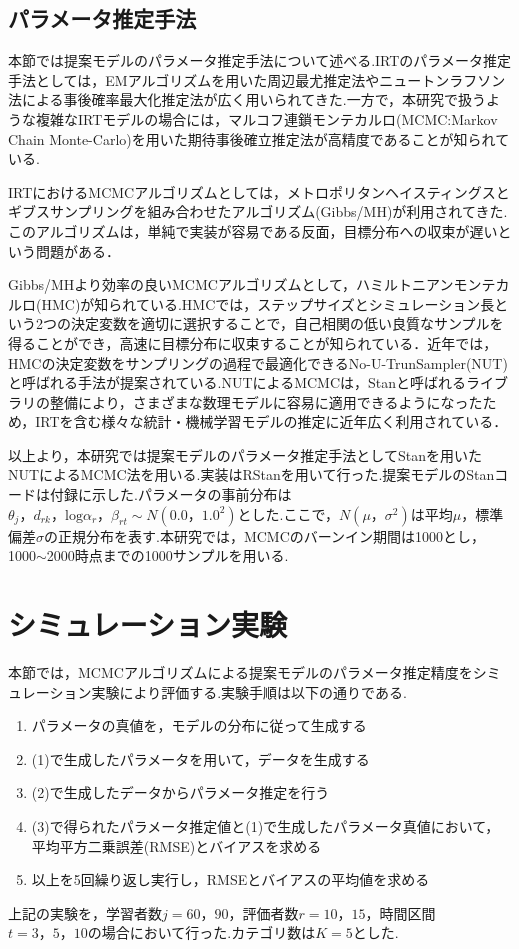\documentclass[a4paper,11pt,oneside,openany]{jsbook}
\begin{document}
\section{パラメータ推定手法}
本節では提案モデルのパラメータ推定手法について述べる.IRTのパラメータ推定手法としては，EMアルゴリズムを用いた周辺最尤推定法やニュートンラフソン法による事後確率最大化推定法が広く用いられてきた.一方で，本研究で扱うような複雑なIRTモデルの場合には，マルコフ連鎖モンテカルロ(MCMC:Markov Chain Monte-Carlo)を用いた期待事後確立推定法が高精度であることが知られている\cite{IRTUtoUeno,norm}.

IRTにおけるMCMCアルゴリズムとしては，メトロポリタンヘイスティングスとギブスサンプリングを組み合わせたアルゴリズム(Gibbs/MH)\cite{IRTUtoUeno,Patz,BiasUsami}が利用されてきた.このアルゴリズムは，単純で実装が容易である反面，目標分布への収束が遅いという問題がある\cite{Hoffman,Giroami}．

Gibbs/MHより効率の良いMCMCアルゴリズムとして，ハミルトニアンモンテカルロ(HMC)が知られている\cite{Rosenthal}.HMCでは，ステップサイズとシミュレーション長という2つの決定変数を適切に選択することで，自己相関の低い良質なサンプルを得ることができ，高速に目標分布に収束することが知られている\cite{Hoffman,Neal}．近年では，HMCの決定変数をサンプリングの過程で最適化できるNo-U-TrunSampler(NUT)\cite{Hoffman}と呼ばれる手法が提案されている.NUTによるMCMCは，Stan\cite{stan}と呼ばれるライブラリの整備により，さまざまな数理モデルに容易に適用できるようになったため，IRTを含む様々な統計・機械学習モデルの推定に近年広く利用されている\cite{Luo,Jiang,Matsura}．

以上より，本研究では提案モデルのパラメータ推定手法としてStanを用いたNUTによるMCMC法を用いる.実装はRStan\cite{rstan}を用いて行った.提案モデルのStanコードは付録に示した.パラメータの事前分布は$\theta_{j}，d_{rk}，\mathrm{log}\alpha_{r}，\beta_{rt}\sim N(0.0，1.0^{2})$とした.ここで，$N(\mu，\sigma^2)$は平均$\mu$，標準偏差$\sigma$の正規分布を表す.本研究では，MCMCのバーンイン期間は1000とし，1000$\sim$2000時点までの1000サンプルを用いる.
\newpage
\chapter{シミュレーション実験}

本節では，MCMCアルゴリズムによる提案モデルのパラメータ推定精度をシミュレーション実験により評価する.実験手順は以下の通りである.
\begin{enumerate}
\item パラメータの真値を，モデルの分布に従って生成する
\item (1)で生成したパラメータを用いて，データを生成する
\item (2)で生成したデータからパラメータ推定を行う
\item (3)で得られたパラメータ推定値と(1)で生成したパラメータ真値において，平均平方二乗誤差(RMSE)とバイアスを求める
\item 以上を5回繰り返し実行し，RMSEとバイアスの平均値を求める
\end{enumerate}
上記の実験を，学習者数$j=60，90$，評価者数$r=10，15$，時間区間$t=3，5，10$の場合において行った.カテゴリ数は$K=5$とした.
\end{document}
